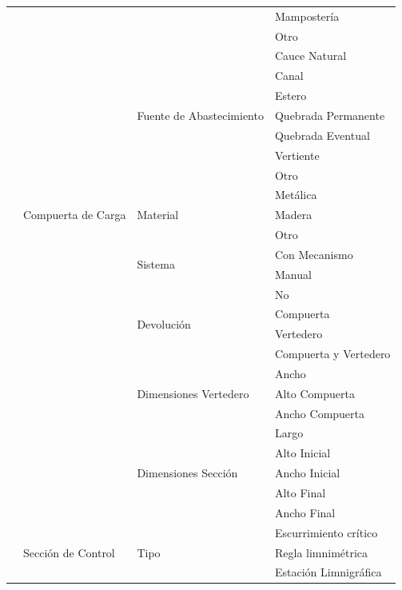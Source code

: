 \documentclass[]{article}
\begin{document}
\begin{longtable}{|p{3cm}|p{3.5cm}|p{3.5cm}|p{3.5cm}|}
    & & & Mampostería\\    \cline{4-4}
    & & & Otro\\    \cline{2-4}
    & \multirow {17}{3.5cm}{Compuerta de Carga} & \multirow {7}{3.5cm}{Fuente de Abastecimiento} &  Cauce Natural\\    \cline{4-4}
    & & & Canal\\    \cline{4-4}
    & & & Estero\\    \cline{4-4}
    & & & Quebrada Permanente\\    \cline{4-4}
    & & & Quebrada Eventual\\    \cline{4-4}
    & & & Vertiente\\    \cline{4-4}
    & & & Otro\\    \cline{3-4}
    & & \multirow {3}{3.5cm}{Material} & Metálica\\    \cline{4-4}
    & & & Madera\\    \cline{4-4}
    & & & Otro\\    \cline{3-4}
    & & \multirow {2}{3.5cm}{Sistema} & Con Mecanismo\\    \cline{4-4}
    & & & Manual\\    \cline{3-4}
    & & \multirow {4}{3.5cm}{Devolución} & No\\    \cline{4-4}
    & & & Compuerta\\    \cline{4-4}
    & & & Vertedero\\    \cline{4-4}
    & & & Compuerta y Vertedero\\    \cline{3-4}
    & & \multirow {3}{3.5cm}{Dimensiones Vertedero} & Ancho\\    \cline{4-4}
    & & & Alto Compuerta\\    \cline{4-4}
    & & & Ancho Compuerta\\    \cline{3-4}
    & & \multirow {5}{3.5cm}{Dimensiones Sección} & Largo\\    \cline{4-4}
    & & & Alto Inicial\\    \cline{4-4}
    & & & Ancho Inicial\\    \cline{4-4}
    & & & Alto Final\\    \cline{4-4}
    & & & Ancho Final\\    \cline{2-4} \pagebreak
    \multirow {17}{3cm}{Bocatoma} & \multirow {17}{3.5cm}{Sección de Control} & \multirow {11}{3.5cm}{Tipo} &  Escurrimiento crítico\\    \cline{4-4}
    & & & Regla limnimétrica\\    \cline{4-4}
    & & & Estación Limnigráfica\\    \cline{4-4}

\end{longtable}
\end{document}
